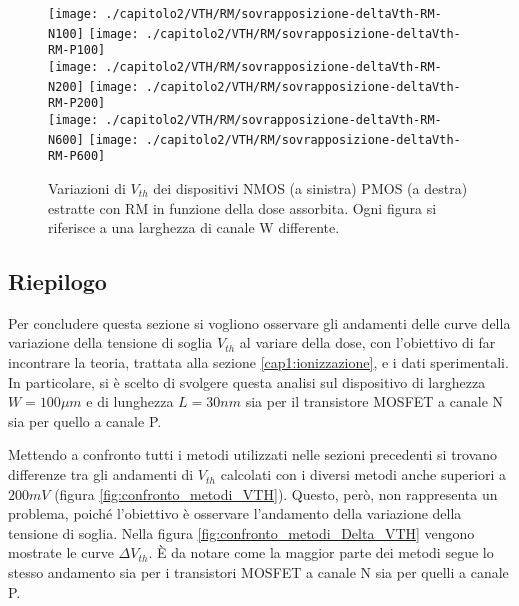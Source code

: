 \clearpage

\begin{figure}[ht]
  \centering
  \texttt{[image: ./capitolo2/VTH/RM/sovrapposizione-deltaVth-RM-N100]}
  \texttt{[image: ./capitolo2/VTH/RM/sovrapposizione-deltaVth-RM-P100]}\\
  \vspace{0.2cm}
  \texttt{[image: ./capitolo2/VTH/RM/sovrapposizione-deltaVth-RM-N200]}
  \texttt{[image: ./capitolo2/VTH/RM/sovrapposizione-deltaVth-RM-P200]}\\
  \vspace{0.2cm}
  \texttt{[image: ./capitolo2/VTH/RM/sovrapposizione-deltaVth-RM-N600]}
  \texttt{[image: ./capitolo2/VTH/RM/sovrapposizione-deltaVth-RM-P600]}
  \caption[Dati $\Delta V_{th}$ estratti con RM]{Variazioni di $V_{th}$ dei dispositivi NMOS (a sinistra) PMOS (a destra) estratte con RM in funzione della dose assorbita. Ogni figura si riferisce a una larghezza di canale W differente.}
  \label{fig:DeltaVthRM}
\end{figure}

\FloatBarrier

\subsection{Riepilogo}
Per concludere questa sezione si vogliono osservare gli andamenti delle curve della variazione della tensione di soglia $V_{th}$ al variare della dose, con l'obiettivo di far incontrare la teoria, trattata alla sezione \ref{cap1:ionizzazione}, e i dati sperimentali.
In particolare, si è scelto di svolgere questa analisi sul dispositivo di larghezza $W = 100 \mu m$ e di lunghezza $L = 30 nm$ sia per il transistore MOSFET a canale N sia per quello a canale P. 

Mettendo a confronto tutti i metodi utilizzati nelle sezioni precedenti si trovano differenze tra gli andamenti di $V_{th}$ calcolati con i diversi metodi anche superiori a $200mV$ (figura \ref{fig:confronto_metodi_VTH}). Questo, però, non rappresenta un problema, poiché l'obiettivo è osservare l'andamento della variazione della tensione di soglia. Nella figura \ref{fig:confronto_metodi_Delta_VTH} vengono mostrate le curve $\Delta V_{th}$. È da notare come la maggior parte dei metodi segue lo stesso andamento sia per i transistori MOSFET a canale N sia per quelli a canale P.


